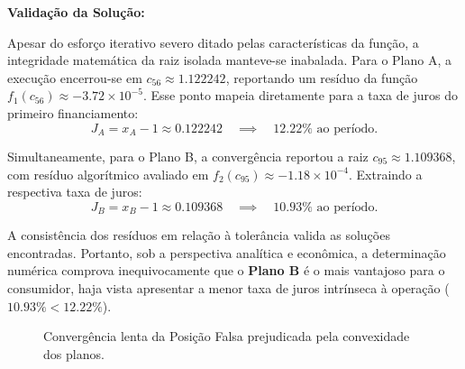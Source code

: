 \textbf{Validação da Solução:}

Apesar do esforço iterativo severo ditado pelas características da função, a integridade matemática da raiz isolada manteve-se inabalada. Para o Plano A, a execução encerrou-se em $c_{56} \approx 1.122242$, reportando um resíduo da função $f_1(c_{56}) \approx -3.72 \times 10^{-5}$. Esse ponto mapeia diretamente para a taxa de juros do primeiro financiamento:
\begin{equation}
    J_A = x_A - 1 \approx 0.122242 \quad \implies \quad 12.22\% \text{ ao período.}
\end{equation}

Simultaneamente, para o Plano B, a convergência reportou a raiz $c_{95} \approx 1.109368$, com resíduo algorítmico avaliado em $f_2(c_{95}) \approx -1.18 \times 10^{-4}$. Extraindo a respectiva taxa de juros:
\begin{equation}
    J_B = x_B - 1 \approx 0.109368 \quad \implies \quad 10.93\% \text{ ao período.}
\end{equation}

A consistência dos resíduos em relação à tolerância valida as soluções encontradas. Portanto, sob a perspectiva analítica e econômica, a determinação numérica comprova inequivocamente que o \textbf{Plano B} é o mais vantajoso para o consumidor, haja vista apresentar a menor taxa de juros intrínseca à operação ($10.93\% < 12.22\%$).

\begin{figure}[H]
    \centering
    \caption{Convergência lenta da Posição Falsa prejudicada pela convexidade dos planos.}
    \label{fig:convergencia_posicao_falsa_juros}
\end{figure}

